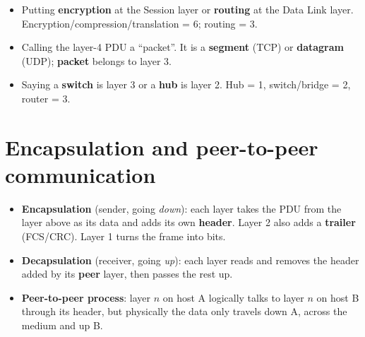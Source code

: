\documentclass[10pt]{article}
\begin{document}
\begin{trap}
\begin{itemize}
\item Putting \textbf{encryption} at the Session layer or \textbf{routing} at the Data Link layer. Encryption/compression/translation = 6; routing = 3.
\item Calling the layer-4 PDU a ``packet''. It is a \textbf{segment} (TCP) or \textbf{datagram} (UDP); \textbf{packet} belongs to layer 3.
\item Saying a \textbf{switch} is layer 3 or a \textbf{hub} is layer 2. Hub = 1, switch/bridge = 2, router = 3.
\end{itemize}
\end{trap}

\section{Encapsulation and peer-to-peer communication}\label{sec:encap}

\begin{itemize}
\item \textbf{Encapsulation} (sender, going \emph{down}): each layer takes the PDU from the layer above as its data and adds its own \textbf{header}. Layer 2 also adds a \textbf{trailer} (FCS/CRC). Layer 1 turns the frame into bits.
\item \textbf{Decapsulation} (receiver, going \emph{up}): each layer reads and removes the header added by its \textbf{peer} layer, then passes the rest up.
\item \textbf{Peer-to-peer process}: layer $n$ on host A logically talks to layer $n$ on host B through its header, but physically the data only travels down A, across the medium and up B.
\end{itemize}
\end{document}
